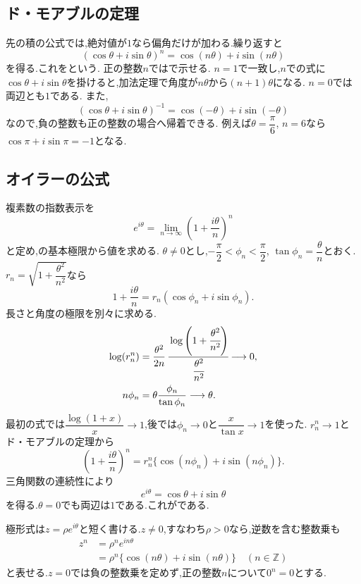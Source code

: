   \subsection{ド・モアブルの定理}\label{節：ド・モアブルの定理}
    先の積の公式では,絶対値が$1$なら偏角だけが加わる.繰り返すと
    \[
      (\cos\theta+i\sin\theta)^n=\cos(n\theta)+i\sin(n\theta)
    \]
    を得る.これをという.
    正の整数$n$ではで示せる.
    $n=1$で一致し,$n$での式に$\cos\theta+i\sin\theta$を掛けると,加法定理で角度が$n\theta$から$(n+1)\theta$になる.
    $n=0$では両辺とも$1$である.
    また,
    \[
      (\cos\theta+i\sin\theta)^{-1}=\cos(-\theta)+i\sin(-\theta)
    \]
    なので,負の整数も正の整数の場合へ帰着できる.
    例えば$\theta=\dfrac{\pi}{6}$, $n=6$なら$\cos\pi+i\sin\pi=-1$となる.

  \subsection{オイラーの公式}\label{節：オイラーの公式}
    複素数の指数表示を
    \[
      e^{i\theta}=\lim_{n\to\infty}\left(1+\frac{i\theta}{n}\right)^n
    \]
    と定め,の基本極限から値を求める.
    $\theta\ne0$とし,$-\dfrac{\pi}{2}<\phi_n<\dfrac{\pi}{2}$, $\tan\phi_n=\dfrac{\theta}{n}$とおく.
    $r_n=\sqrt{1+\dfrac{\theta^2}{n^2}}$なら
    \[
      1+\frac{i\theta}{n}=r_n(\cos\phi_n+i\sin\phi_n).
    \]
    長さと角度の極限を別々に求める.
    \begin{align*}
      \log(r_n^n)
      &=\frac{\theta^2}{2n}\,
        \cfrac{\log\left(1+\cfrac{\theta^2}{n^2}\right)}{\cfrac{\theta^2}{n^2}}\longrightarrow0,\\
      n\phi_n&=\theta\frac{\phi_n}{\tan\phi_n}\longrightarrow\theta.
    \end{align*}
    最初の式では$\dfrac{\log(1+x)}{x}\to1$,後では$\phi_n\to0$と$\dfrac{x}{\tan x}\to1$を使った.
    $r_n^n\to1$とド・モアブルの定理から
    \[
      \left(1+\frac{i\theta}{n}\right)^n
      =r_n^n\{\cos(n\phi_n)+i\sin(n\phi_n)\}.
    \]
    三角関数の連続性により
    \[
      e^{i\theta}=\cos\theta+i\sin\theta
    \]
    を得る.$\theta=0$でも両辺は$1$である.これがである.

    極形式は$z=\rho e^{i\theta}$と短く書ける.$z\ne0$,すなわち$\rho>0$なら,逆数を含む整数乗も
    \[
      \begin{aligned}
        z^n&=\rho^n e^{in\theta}\\
        &=\rho^n\{\cos(n\theta)+i\sin(n\theta)\}
          \quad(n\in\mathbb Z)
      \end{aligned}
    \]
    と表せる.$z=0$では負の整数乗を定めず,正の整数$n$について$0^n=0$とする.

